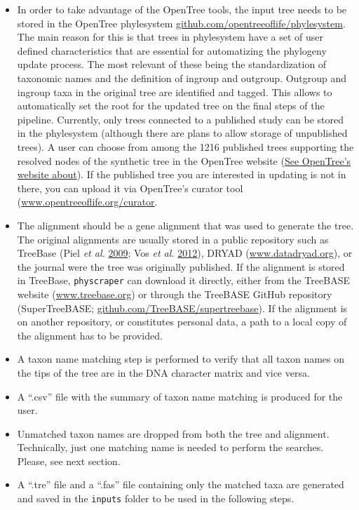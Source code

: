 \documentclass[]{article}
\providecommand{\tightlist}{%
  \setlength{\itemsep}{0pt}\setlength{\parskip}{0pt}}
\begin{document}
\begin{itemize}
\tightlist
\item
  In order to take advantage of the OpenTree tools, the input tree needs to be stored in the
  OpenTree phylesystem \href{https://github.com/opentreeoflife/phylesystem}{github.com/opentreeoflife/phylesystem}.
  The main
  reason for this is that trees in phylesystem have a set of user defined characteristics
  that are essential for automatizing the phylogeny update process. The most relevant of these being the standardization of taxonomic names and the definition of ingroup and outgroup. Outgroup and ingroup taxa in the original tree are identified and tagged. This allows to automatically set the root for the updated tree on the final steps of the pipeline.
  Currently, only trees connected to
  a published study can be stored in the phylesystem (although there are plans to
  allow storage of unpublished trees).
  A user can choose from among the 1216 published trees supporting the resolved nodes of the synthetic tree in the OpenTree website (\href{https://tree.opentreeoflife.org/about/synthesis-release/v12.3}{See OpenTree's website about}). If the published tree you are interested in updating is not in there, you can upload it via OpenTree's curator tool (\href{https://tree.opentreeoflife.org/curator}{www.opentreeoflife.org/curator}.
\item
  The alignment should be a gene alignment that was used to generate the tree. The original
  alignments are usually stored in a public repository such as TreeBase (Piel \emph{et al.} \protect\hyperlink{ref-piel2009treebase}{2009}; Vos \emph{et al.} \protect\hyperlink{ref-vos2012nexml}{2012}),
  DRYAD (\href{http://datadryad.org/}{www.datadryad.org}), or the journal were the tree was originally published.
  If the alignment is stored in TreeBase, \texttt{physcraper} can download it directly,
  either from the TreeBASE website (\href{https://treebase.org/}{www.treebase.org})
  or through the TreeBASE GitHub repository (SuperTreeBASE; \href{https://github.com/TreeBASE/supertreebase}{github.com/TreeBASE/supertreebase}).
  If the alignment is on another repository, or constitutes personal data, a path to a local copy of the alignment has to be provided.
\item
  A taxon name matching step is performed to verify that all taxon names on the tips
  of the tree are in the DNA character matrix and vice versa.
\item
  A ``.csv'' file with the summary of taxon name matching is produced for the user.
\item
  Unmatched taxon names are dropped from both the tree and alignment.
  Technically, just one matching name is needed to perform the searches. Please, see next section.
\item
  A ``.tre'' file and a ``.fas'' file containing only the matched taxa are generated and saved in the \texttt{inputs} folder to be used in the following steps.
\end{itemize}
\end{document}
